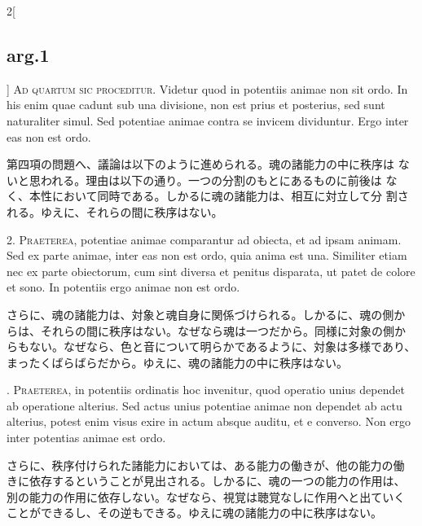\documentclass[paper=a4paper,fontsize=10pt,jafontsize=9pt,titlepage]{jlreq}
\begin{document}
\begin{paracol}{2}[\subsection{arg.1}]
{\scshape Ad quartum sic proceditur}. Videtur quod in potentiis animae
non sit ordo. In his enim quae cadunt sub una divisione, non est prius
et posterius, sed sunt naturaliter simul. Sed potentiae animae contra
se invicem dividuntur. Ergo inter eas non est ordo.

 
\switchcolumn

 第四項の問題へ、議論は以下のように進められる。魂の諸能力の中に秩序は
 ないと思われる。理由は以下の通り。一つの分割のもとにあるものに前後は
 なく、本性において同時である。しかるに魂の諸能力は、相互に対立して分
 割される。ゆえに、それらの間に秩序はない。





2. {\scshape Praeterea}, potentiae animae comparantur ad obiecta, et
ad ipsam animam. Sed ex parte animae, inter eas non est ordo, quia
anima est una. Similiter etiam nec ex parte obiectorum, cum sint
diversa et penitus disparata, ut patet de colore et sono. In potentiis
ergo animae non est ordo.

 
\switchcolumn

さらに、魂の諸能力は、対象と魂自身に関係づけられる。しかるに、魂の側か
らは、それらの間に秩序はない。なぜなら魂は一つだから。同様に対象の側か
らもない。なぜなら、色と音について明らかであるように、対象は多様であり、
まったくばらばらだから。ゆえに、魂の諸能力の中に秩序はない。

. {\scshape Praeterea}, in potentiis ordinatis hoc invenitur, quod
operatio unius dependet ab operatione alterius. Sed actus unius
potentiae animae non dependet ab actu alterius, potest enim visus
exire in actum absque auditu, et e converso. Non ergo inter potentias
animae est ordo.
 
\switchcolumn

さらに、秩序付けられた諸能力においては、ある能力の働きが、他の能力の働
きに依存するということが見出される。しかるに、魂の一つの能力の作用は、
別の能力の作用に依存しない。なぜなら、視覚は聴覚なしに作用へと出ていく
ことができるし、その逆もできる。ゆえに魂の諸能力の中に秩序はない。
 


\end{paracol}
\end{document}
